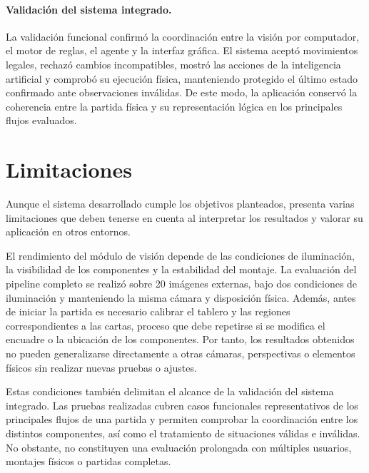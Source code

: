 \paragraph{Validación del sistema integrado.}
La validación funcional confirmó la coordinación entre la visión por computador, el motor de reglas, el agente y la interfaz gráfica. El sistema aceptó movimientos legales, rechazó cambios incompatibles, mostró las acciones de la inteligencia artificial y comprobó su ejecución física, manteniendo protegido el último estado confirmado ante observaciones inválidas. De este modo, la aplicación conservó la coherencia entre la partida física y su representación lógica en los principales flujos evaluados.

\endgroup


\section{Limitaciones}
\label{sec:limitaciones}

Aunque el sistema desarrollado cumple los objetivos planteados, presenta varias limitaciones que deben tenerse en cuenta al interpretar los resultados y valorar su aplicación en otros entornos.

El rendimiento del módulo de visión depende de las condiciones de iluminación, la visibilidad de los componentes y la estabilidad del montaje. La evaluación del pipeline completo se realizó sobre 20 imágenes externas, bajo dos condiciones de iluminación y manteniendo la misma cámara y disposición física. Además, antes de iniciar la partida es necesario calibrar el tablero y las regiones correspondientes a las cartas, proceso que debe repetirse si se modifica el encuadre o la ubicación de los componentes. Por tanto, los resultados obtenidos no pueden generalizarse directamente a otras cámaras, perspectivas o elementos físicos sin realizar nuevas pruebas o ajustes.

Estas condiciones también delimitan el alcance de la validación del sistema integrado. Las pruebas realizadas cubren casos funcionales representativos de los principales flujos de una partida y permiten comprobar la coordinación entre los distintos componentes, así como el tratamiento de situaciones válidas e inválidas. No obstante, no constituyen una evaluación prolongada con múltiples usuarios, montajes físicos o partidas completas.

